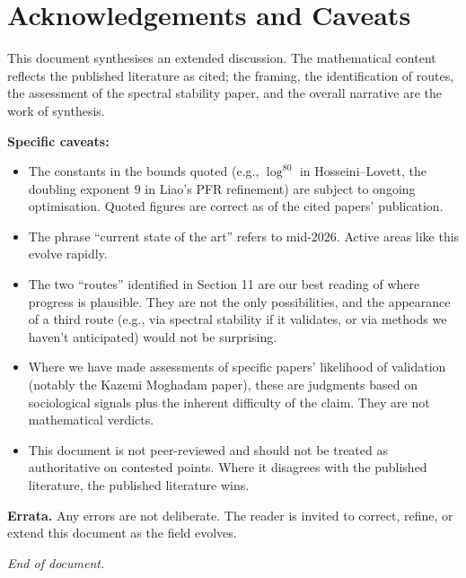 \documentclass[11pt,a4paper]{article}
\theoremstyle{plain}
\theoremstyle{definition}
\theoremstyle{remark}
\begin{document}
\section{Acknowledgements and Caveats}

This document synthesises an extended discussion. The mathematical content reflects the published literature as cited; the framing, the identification of routes, the assessment of the spectral stability paper, and the overall narrative are the work of synthesis.

\textbf{Specific caveats:}

\begin{itemize}[leftmargin=2em]
  \item The constants in the bounds quoted (e.g., $\log^{80}$ in Hosseini--Lovett, the doubling exponent $9$ in Liao's PFR refinement) are subject to ongoing optimisation. Quoted figures are correct as of the cited papers' publication.
  \item The phrase ``current state of the art'' refers to mid-2026. Active areas like this evolve rapidly.
  \item The two ``routes'' identified in Section 11 are our best reading of where progress is plausible. They are not the only possibilities, and the appearance of a third route (e.g., via spectral stability if it validates, or via methods we haven't anticipated) would not be surprising.
  \item Where we have made assessments of specific papers' likelihood of validation (notably the Kazemi Moghadam paper), these are judgments based on sociological signals plus the inherent difficulty of the claim. They are not mathematical verdicts.
  \item This document is not peer-reviewed and should not be treated as authoritative on contested points. Where it disagrees with the published literature, the published literature wins.
\end{itemize}

\textbf{Errata.} Any errors are not deliberate. The reader is invited to correct, refine, or extend this document as the field evolves.

\vspace{2em}
\begin{center}
\textit{End of document.}
\end{center}
\end{document}
